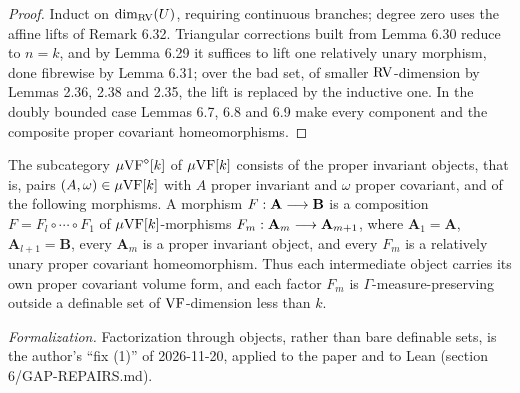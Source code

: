\begin{proof}
\leanok
Induct on $\dim_{\mathrm{RV}}(U)$, requiring continuous branches; degree zero uses the affine lifts of Remark 6.32. Triangular corrections built from Lemma 6.30 reduce to $n=k$, and by Lemma 6.29 it suffices to lift one relatively unary morphism, done fibrewise by Lemma 6.31; over the bad set, of smaller $\mathrm{RV}$-dimension by Lemmas 2.36, 2.38 and 2.35, the lift is replaced by the inductive one. In the doubly bounded case Lemmas 6.7, 6.8 and 6.9 make every component and the composite proper covariant homeomorphisms.
\end{proof}

\setcounter{theorem}{33}
\begin{definition}
\label{defn-diamond}
\leanok
{}
The subcategory $\mu\mathrm{VF}^{\diamond}[k]$ of $\mu\mathrm{VF}[k]$ consists of the proper invariant objects, that is, pairs $(A,\omega)\in\mu\mathrm{VF}[k]$ with $A$ proper invariant and $\omega$ proper covariant, and of the following morphisms. A morphism $F:\mathbf{A}\longrightarrow\mathbf{B}$ is a composition $F=F_l\circ\cdots\circ F_1$ of $\mu\mathrm{VF}[k]$-morphisms $F_m:\mathbf{A}_m\longrightarrow\mathbf{A}_{m+1}$, where $\mathbf{A}_1=\mathbf{A}$, $\mathbf{A}_{l+1}=\mathbf{B}$, every $\mathbf{A}_m$ is a proper invariant object, and every $F_m$ is a relatively unary proper covariant homeomorphism. Thus each intermediate object carries its own proper covariant volume form, and each factor $F_m$ is $\Gamma$-measure-preserving outside a definable set of $\mathrm{VF}$-dimension less than $k$.

\emph{Formalization.} Factorization through objects, rather than bare definable sets, is the author's ``fix (1)'' of 2026-11-20, applied to the paper and to Lean (section 6/GAP-REPAIRS.md).
\end{definition}

